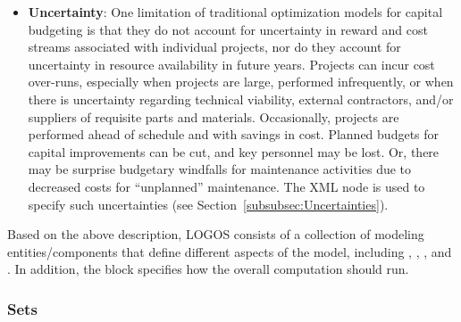 \begin{itemize}
  \item \textbf{Uncertainty}: One limitation of traditional optimization models for capital
  budgeting is that they do not account for uncertainty in reward and cost streams associated
  with individual projects, nor do they account for uncertainty in resource availability in
  future years. Projects can incur cost over-runs, especially when projects are large, performed
  infrequently, or when there is uncertainty regarding technical viability, external contractors,
  and/or suppliers of requisite parts and materials. Occasionally, projects are performed ahead
  of schedule and with savings in cost. Planned budgets for capital improvements can be cut, and key
  personnel may be lost. Or, there may be surprise budgetary windfalls for maintenance activities
  due to decreased costs for “unplanned” maintenance. The XML node  is used
  to specify such uncertainties (see Section~\ref{subsubsec:Uncertainties}).
\end{itemize}

Based on the above description, LOGOS consists of a collection of modeling
entities/components that define different aspects of the model, including
, , , and
. In addition, the 
block specifies how the overall computation should run.

\subsubsection{Sets}
\label{subsubsec:Sets}

